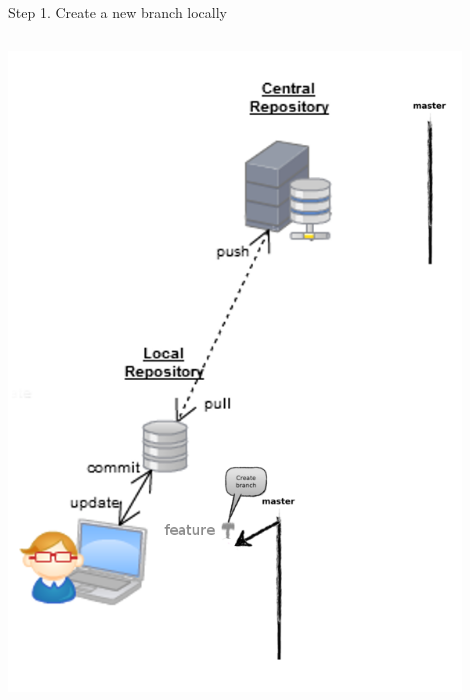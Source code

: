 \begin{frame}[fragile]{Step 1. Create a new branch locally}
\begin{columns}
\begin{column}{0.4\textwidth}
\begin{center}
{				\includegraphics[width=0.9\textwidth]{branch_created.png}
			}
		\end{center}
	\end{column}
\end{columns}
\end{frame}

